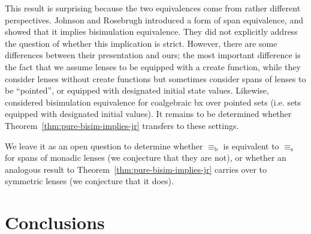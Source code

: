 \documentclass[runningheads]{llncs}
\begin{document}
This result is surprising because the two equivalences come from
rather different perspectives.  Johnson and Rosebrugh introduced a
form of span equivalence, and showed that it implies bisimulation
equivalence.  They did not explicitly address the question of whether
this implication is strict.  However, there are some differences
between their presentation and ours; the most important difference is
the fact that we assume lenses to be equipped with a create function,
while they consider lenses without create functions but sometimes
consider spans of lenses to be ``pointed'', or equipped with
designated initial state values.  Likewise, \citet{abousaleh15bx}
considered bisimulation equivalence for coalgebraic bx over pointed
sets (i.e. sets equipped with designated initial values).  It remains
to be determined whether Theorem~\ref{thm:pure-bisim-implies-jr}
transfers to these settings.



We leave it as an open question to determine whether \ensuremath{\equiv_{\mathrm{b}} } is
equivalent to \ensuremath{\equiv_{\mathrm{s}} } for spans of monadic lenses (we conjecture
that they are not), or whether an
analogous result to Theorem~\ref{thm:pure-bisim-implies-jr} carries over
to symmetric lenses (we conjecture that it does).


































\section{Conclusions}
\end{document}
